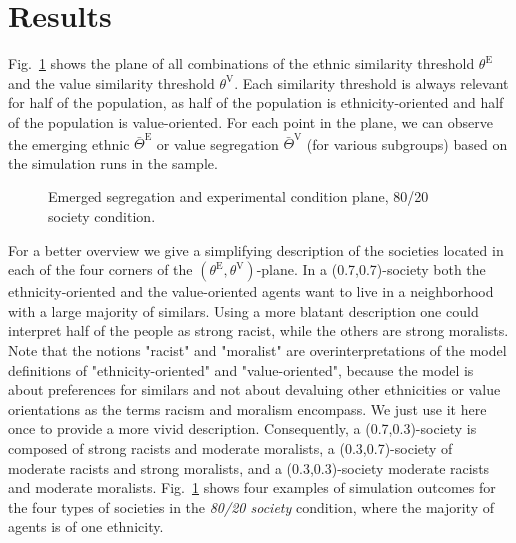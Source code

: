 \documentclass{ws-acs}
\begin{document}
{\section{Results}

Fig.~\ref{fig:80_20} shows the plane of all combinations of the ethnic similarity threshold $\theta^\text{E}$ and the value similarity threshold  $\theta^\text{V}$. Each similarity threshold is always relevant for half of the population, as half of the population is ethnicity-oriented and half of the population is value-oriented. For each point in the plane, we can observe the emerging ethnic $\bar\Theta^\text{E}$ or value segregation $\bar\Theta^\text{V}$ (for various subgroups) based on the simulation runs in the sample. 

\begin{figure}[th]
\centerline{}
\vspace*{8pt}
\caption{Emerged segregation and experimental condition plane, 80/20 society condition.}
\label{fig:80_20}
\end{figure}

For a better overview we give a simplifying description of the societies located in each of the four corners of the $(\theta^\text{E},\theta^\text{V})$-plane. In a (0.7,0.7)-society both the ethnicity-oriented and the value-oriented agents want to live in a neighborhood with a large majority of similars. Using a more blatant description one could interpret half of the people as strong racist, while the others are strong moralists. Note that the notions "racist" and "moralist" are overinterpretations of the model definitions of "ethnicity-oriented" and "value-oriented", because the model is about preferences for similars and not about devaluing other ethnicities or value orientations as the terms racism and moralism encompass. We just use it here once to provide a more vivid description. Consequently, a (0.7,0.3)-society is composed of strong racists and moderate moralists, a (0.3,0.7)-society of moderate racists and strong moralists, and a (0.3,0.3)-society moderate racists and moderate moralists.  Fig.~\ref{fig:80_20} shows four examples of simulation outcomes for the four types of societies in the {\it 80/20 society} condition, where the majority of agents is of one ethnicity. 

}
\end{document}
